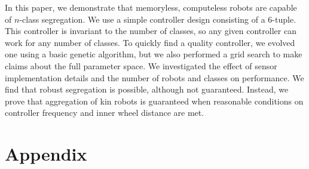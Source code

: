 \documentclass[conference]{IEEEtran}
\begin{document}
  In this paper, we demonstrate that memoryless, computeless robots are capable of $n$-class segregation. We use a simple controller design consisting of a 6-tuple. This controller is invariant to the number of classes, so any given controller can work for any number of classes. To quickly find a quality controller, we evolved one using a basic genetic algorithm, but we also performed a grid search to make claims about the full parameter space. We investigated the effect of sensor implementation details and the number of robots and classes on performance. We find that robust segregation is possible, although not guaranteed. Instead, we prove that aggregation of kin robots is guaranteed when reasonable conditions on controller frequency and inner wheel distance are met.




\onecolumn
\appendix
\section{Appendix}
\end{document}

